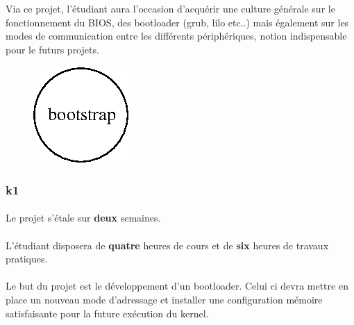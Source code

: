 \documentclass[10pt,a4wide]{article}
\begin{document}
Via ce projet, l'\'etudiant aura l'occasion d'acqu\'erir une culture
g\'en\'erale sur le fonctionnement du BIOS, des bootloader (grub, lilo
etc..) mais \'egalement sur les modes de communication entre les
diff\'erents p\'eriph\'eriques, notion indispensable pour le futurs
projets.

\vspace{5cm}

\begin{figure}[h]
\centerline{\includegraphics{figures/k0.eps}}
\end{figure}

\newpage

\subsubsection{k1}

\paragraph{}

Le projet s'\'etale sur \textbf{deux} semaines.

\paragraph{}

L'\'etudiant disposera de \textbf{quatre} heures de cours et de \textbf{six}
heures de travaux pratiques.

\paragraph{}

Le but du projet est le d\'eveloppement d'un bootloader.
Celui ci devra mettre en place un nouveau mode d'adressage et installer
une configuration m\'emoire satisfaisante pour la future ex\'ecution du kernel.

\paragraph{}
\end{document}
